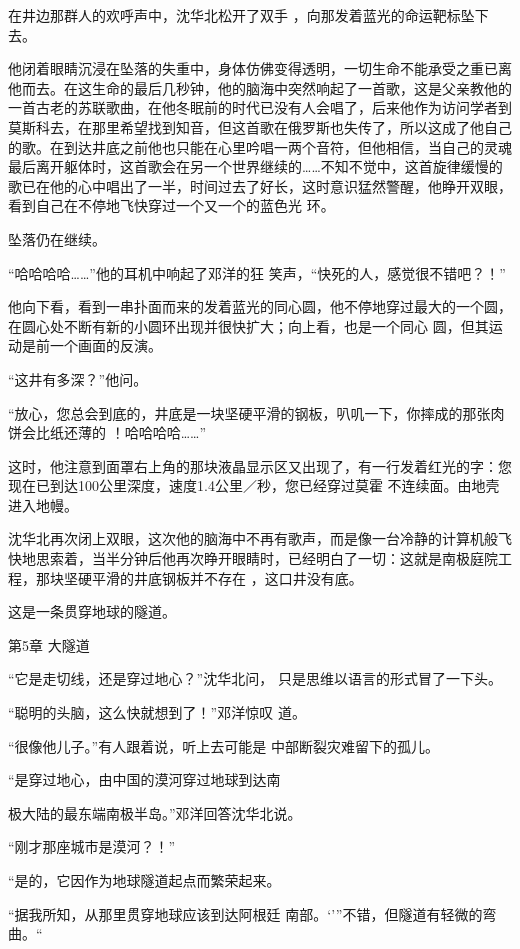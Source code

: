 \documentclass{article}
\begin{document}
在井边那群人的欢呼声中，沈华北松开了双手
，向那发着蓝光的命运靶标坠下去。 

他闭着眼睛沉浸在坠落的失重中，身体仿佛变得透明，一切生命不能承受之重已离他而去。在这生命的最后几秒钟，他的脑海中突然响起了一首歌，这是父亲教他的一首古老的苏联歌曲，在他冬眠前的时代已没有人会唱了，后来他作为访问学者到莫斯科去，在那里希望找到知音，但这首歌在俄罗斯也失传了，所以这成了他自己的歌。在到达井底之前他也只能在心里吟唱一两个音符，但他相信，当自己的灵魂最后离开躯体时，这首歌会在另一个世界继续的……不知不觉中，这首旋律缓慢的歌已在他的心中唱出了一半，时间过去了好长，这时意识猛然警醒，他睁开双眼，看到自己在不停地飞快穿过一个又一个的蓝色光
环。 

\newpage


坠落仍在继续。 

“哈哈哈哈……”他的耳机中响起了邓洋的狂
笑声，“快死的人，感觉很不错吧？！” 

他向下看，看到一串扑面而来的发着蓝光的同心圆，他不停地穿过最大的一个圆，在圆心处不断有新的小圆环出现并很快扩大；向上看，也是一个同心
圆，但其运动是前一个画面的反演。 


“这井有多深？”他问。 

“放心，您总会到底的，井底是一块坚硬平滑的钢板，叭叽一下，你摔成的那张肉饼会比纸还薄的
！哈哈哈哈……” 

这时，他注意到面罩右上角的那块液晶显示区又出现了，有一行发着红光的字：您现在已到达100公里深度，速度1.4公里／秒，您已经穿过莫霍
不连续面。由地壳进入地幔。 

\newpage

沈华北再次闭上双眼，这次他的脑海中不再有歌声，而是像一台冷静的计算机般飞快地思索着，当半分钟后他再次睁开眼睛时，已经明白了一切：这就是南极庭院工程，那块坚硬平滑的井底钢板并不存在
，这口井没有底。 


这是一条贯穿地球的隧道。 


第5章 大隧道 

“它是走切线，还是穿过地心？”沈华北问，
只是思维以语言的形式冒了一下头。 

“聪明的头脑，这么快就想到了！”邓洋惊叹
道。 

“很像他儿子。”有人跟着说，听上去可能是
中部断裂灾难留下的孤儿。 

“是穿过地心，由中国的漠河穿过地球到达南

\newpage
极大陆的最东端南极半岛。”邓洋回答沈华北说。 


“刚才那座城市是漠河？！” 

“是的，它因作为地球隧道起点而繁荣起来。

“据我所知，从那里贯穿地球应该到达阿根廷
南部。‘’”不错，但隧道有轻微的弯曲。“ 
\end{document}
